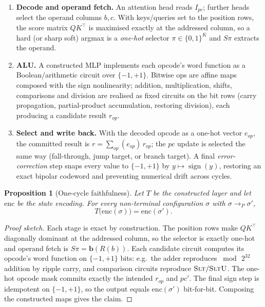 \documentclass[11pt]{article}
\theoremstyle{definition}
\theoremstyle{plain}
\newtheorem{proposition}{Proposition}
\theoremstyle{remark}
\newcommand{\step}{\longrightarrow}
\newcommand{\bp}{\{-1,+1\}}
\begin{document}
\begin{enumerate}[nosep,leftmargin=1.4em]
\item \textbf{Decode and operand fetch.} An attention head reads $I_{pc}$; further heads select the
      operand columns $b,c$. With keys/queries set to the position rows, the score matrix
      $Q K^{\top}$ is maximised exactly at the addressed column, so a hard (or sharp soft) argmax is a
      \emph{one-hot} selector $\pi \in \{0,1\}^{K}$ and $S\pi$ extracts the operand.
\item \textbf{ALU.} A constructed MLP implements each opcode's word function as a Boolean/arithmetic
      circuit over $\bp$. Bitwise ops are affine maps composed with the sign nonlinearity; addition,
      multiplication, shifts, comparisons and division are realised as fixed circuits on the bit rows
      (carry propagation, partial-product accumulation, restoring division), each producing a
      candidate result $r_{\mathit{op}}$.
\item \textbf{Select and write back.} With the decoded opcode as a one-hot vector $e_{\mathit{op}}$,
      the committed result is $r = \sum_{\mathit{op}} (e_{\mathit{op}})\, r_{\mathit{op}}$; the
      $pc$ update is selected the same way (fall-through, jump target, or branch target). A final
      \emph{error-correction} step snaps every value to $\bp$ by $y \mapsto \operatorname{sign}(y)$,
      restoring an exact bipolar codeword and preventing numerical drift across cycles.
\end{enumerate}

\begin{proposition}[One-cycle faithfulness]\label{prop:faithful}
Let $T$ be the constructed layer and let $\mathrm{enc}$ be the state encoding. For every non-terminal
configuration $\sigma$ with $\sigma \step_P \sigma'$,
\[
   T\big(\mathrm{enc}(\sigma)\big) = \mathrm{enc}(\sigma').
\]
\end{proposition}
\begin{proof}[Proof sketch]
Each stage is exact by construction. The position rows make $QK^\top$ diagonally dominant at the
addressed column, so the selector is exactly one-hot and operand fetch is $S\pi = \mathbf b(R(b))$.
Each candidate circuit computes its opcode's word function on $\bp$ bits: e.g.\ the adder reproduces
$\bmod\,2^{32}$ addition by ripple carry, and comparison circuits reproduce $\textsc{Slt}/\textsc{SltU}$.
The one-hot opcode mask commits exactly the intended $r_{\mathit{op}}$ and $pc'$. The final sign step is
idempotent on $\bp$, so the output equals $\mathrm{enc}(\sigma')$ bit-for-bit. Composing the constructed
maps gives the claim.
\end{proof}
\end{document}
